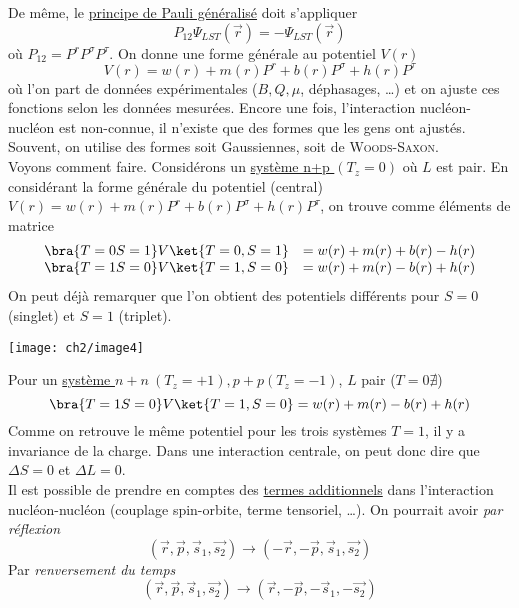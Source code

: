 De même, le \underline{principe de Pauli généralisé} doit s'appliquer
\begin{equation}
P_{12}\Psi_{LST}(\vec{r}) = -\Psi_{LST}(\vec{r})
\end{equation}
où $P_{12}=P^rP^\sigma P^\tau$. On donne une forme générale au potentiel $V(r)$
\begin{equation}
V(r) = w(r)+m(r)P^r+b(r)P^\sigma + h(r)P^\tau
\end{equation}
où l'on part de données expérimentales ($B, Q, \mu$, déphasages, \dots) et on ajuste ces fonctions selon les
données mesurées. Encore une fois, l'interaction nucléon-nucléon est non-connue, il n'existe que des formes 
que les gens ont ajustés. Souvent, on utilise des formes soit Gaussiennes, soit de \textsc{Woods-Saxon}.\\


Voyons comment faire. Considérons un \underline{système n+p $(T_z=0)$} où $L$ est pair. En considérant la
forme générale du potentiel (central) $V(r) = w(r)+m(r)P^r+b(r)P^\sigma + h(r)P^\tau$, on trouve comme
éléments de matrice
\begin{equation}
\begin{array}{ll}
\bra{T=0S=1}V\ket{T=0,S=1} &= w(r)+m(r)+b(r)-h(r)\\
\bra{T=1S=0}V\ket{T=1,S=0} &= w(r)+m(r)-b(r)+h(r)
\end{array}
\end{equation}
On peut déjà remarquer que l'on obtient des potentiels différents pour $S=0$ (singlet) et $S=1$ (triplet). 
\begin{center}
		\texttt{[image: ch2/image4]}
	\end{center}
	
Pour un \underline{système	 $n+n\ (T_z=+1), p+p (T_z=-1)$}, $L$ pair ($T=0\nexists$)
\begin{equation}
\bra{T=1S=0}V\ket{T=1,S=0} = w(r)+m(r)-b(r)+h(r)
\end{equation}
Comme on retrouve le même potentiel pour les trois systèmes $T=1$, il y a invariance de la charge. Dans une
interaction centrale, on peut donc dire que $\Delta S= 0$ et $\Delta L = 0$.\\

Il est possible de prendre en comptes des \underline{termes additionnels} dans l'interaction nucléon-nucléon
(couplage spin-orbite, terme tensoriel, \dots). On pourrait avoir \textit{par réflexion}
\begin{equation}
(\vec r, \vec p, \vec s_1, \vec{s_2}) \to (-\vec r, -\vec p, \vec s_1, \vec{s_2})
\end{equation}
Par \textit{renversement du temps}
\begin{equation}
(\vec r, \vec p, \vec s_1, \vec{s_2}) \to (\vec r, -\vec p, -\vec s_1, -\vec{s_2})
\end{equation}	

